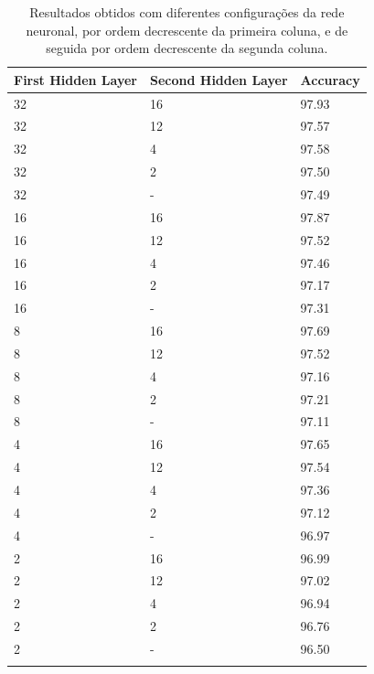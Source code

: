 \documentclass[]{article}
\begin{document}
\begin{table}[h!]
\centering
  \begin{tabular}{lll}
  \hline
  First Hidden Layer & Second Hidden Layer & Accuracy \\ \hline
  32                 & 16                 & 97.93    \\
  32                 & 12                 & 97.57    \\
  32                 & 4                  & 97.58    \\
  32                 & 2                  & 97.50    \\
  32                 & -                  & 97.49    \\
  16                 & 16                 & 97.87    \\
  16                 & 12                 & 97.52    \\
  16                 & 4                  & 97.46    \\
  16                 & 2                  & 97.17    \\
  16                 & -                  & 97.31    \\
  8                 & 16                  & 97.69    \\
  8                 & 12                  & 97.52    \\
  8                 & 4                   & 97.16    \\
  8                 & 2                   & 97.21    \\
  8                 & -                   & 97.11    \\
  4                 & 16                  & 97.65    \\
  4                 & 12                  & 97.54    \\
  4                 & 4                   & 97.36    \\
  4                 & 2                   & 97.12    \\
  4                 & -                   & 96.97    \\
  2                 & 16                  & 96.99    \\
  2                 & 12                  & 97.02    \\
  2                 & 4                   & 96.94    \\
  2                 & 2                   & 96.76    \\
  2                 & -                   & 96.50    \\ \hline \\
  \end{tabular}
  \caption{Resultados obtidos com diferentes configurações da rede neuronal, por ordem decrescente da primeira coluna, e de seguida por ordem decrescente da segunda coluna.}
  \label{tab:grid_search_hidden_layers}
\end{table}
\end{document}
